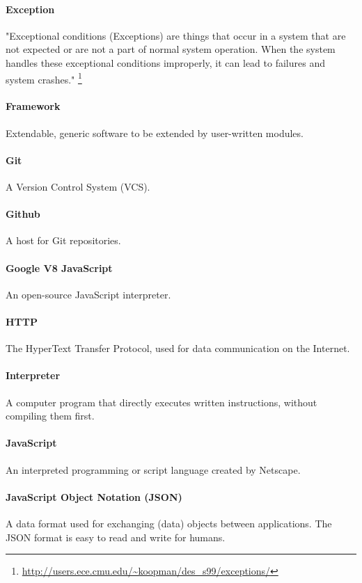 \paragraph{Exception}
"Exceptional conditions (Exceptions) are things that occur in a system that are not expected or are not a part of normal system operation. When the system handles these exceptional conditions improperly, it can lead to failures and system crashes." \footnote{\url{http://users.ece.cmu.edu/~koopman/des_s99/exceptions/}}

\paragraph{Framework}
Extendable, generic software to be extended by user-written modules.

\paragraph{Git}
A Version Control System (VCS).

\paragraph{Github}
A host for Git repositories.

\paragraph{Google V8 JavaScript}
An open-source JavaScript interpreter.

\paragraph{HTTP}
The HyperText Transfer Protocol, used for data communication on the Internet.

\paragraph{Interpreter}
A computer program that directly executes written instructions, without compiling them first.

\paragraph{JavaScript}
An interpreted programming or script language created by Netscape.

\paragraph{JavaScript Object Notation (JSON)}
A data format used for exchanging (data) objects between applications. The JSON format is easy to read and write for humans.

